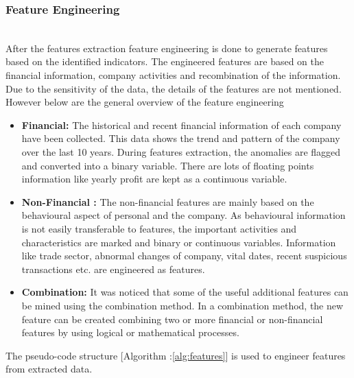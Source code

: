 \subsubsection{Feature Engineering}\hspace*{\fill} \\
After the features extraction feature engineering is done to generate features based on the identified indicators. The engineered features are based on the financial information, company activities and recombination of the information. Due to the sensitivity of the data, the details of the features are not mentioned. However below are the general overview of the feature engineering


\begin{itemize}
    \item \textbf{Financial:} The historical and recent financial information of each company have been collected. This data shows the trend and pattern of the company over the last 10 years. During features extraction, the anomalies are flagged and converted into a binary variable. There are lots of floating points information like yearly profit are kept as a continuous variable. 
    
    \item \textbf{Non-Financial :} The non-financial features are mainly based on the behavioural aspect of personal and the company. As behavioural information is not easily transferable to features, the important activities and characteristics are marked and binary or continuous variables. Information like trade sector, abnormal changes of company, vital dates, recent suspicious transactions etc. are engineered as features.
    
    \item \textbf{Combination:} It was noticed that some of the useful additional features can be mined using the combination method. In a combination method, the new feature can be created combining two or more financial or non-financial features by using logical or mathematical processes. 
\end{itemize}

The pseudo-code structure [Algorithm :\ref{alg:features}] is used to engineer features from extracted data. 

